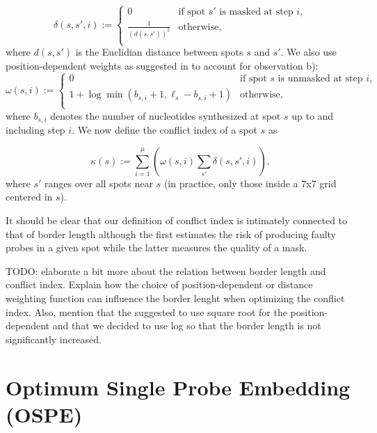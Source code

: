 \documentclass{llncs}
\begin{document}
\begin{equation}
\label{eq:dist_weight} \delta(s,s',i) :=
        \left\{
                \begin{array}{ll}
                        0 & \mbox{if spot $s'$ is masked at step $i$}, \\
                        \frac{1}{(d(s,s'))^{2}} & \mbox{otherwise}, \\
                \end{array}
        \right.
\end{equation}
where $d(s,s')$ is the Euclidian distance between spots $s$ and $s'$. We also use position-dependent weights as suggested in \cite{KAHNG03} to account for observation b):
\begin{equation}
\label{eq:pos_mult} \omega(s,i) :=
        \left\{
                \begin{array}{ll}
                        0 & \mbox{if spot $s$ is unmasked at step $i$}, \\
                        1 + \log{\min(b_{s,i} + 1,\ell_{s} - b_{s,i} + 1)} & \mbox{otherwise}, \\
                \end{array}
        \right.
\end{equation}
where $b_{s,i}$ denotes the number of nucleotides synthesized at spot $s$ up to and including step $i$. We now define the conflict index of a spot $s$ as

\begin{equation}
\label{eq:conf_idx} \kappa(s) := \sum_{i=1}^{\mu} \left( \omega(s,i) \sum_{s'} \delta(s,s',i) \right),
\end{equation}
where $s'$ ranges over all spots near $s$ (in practice, only those inside a 7x7 grid centered in $s$).

It should be clear that our definition of conflict index is intimately connected to that of border length although the first estimates the risk of producing faulty probes in a given spot while the latter measures the quality of a mask.

TODO: elaborate a bit more about the relation between border length and conflict index. Explain how the choice of position-dependent or distance weighting function can influence the border lenght when optimizing the conflict index. Also, mention that the \cite{KAHNG03} suggested to use square root for the position-dependent and that we decided to use log so that the border length is not significantly increased.

\section{Optimum Single Probe Embedding (OSPE)}
\end{document}
